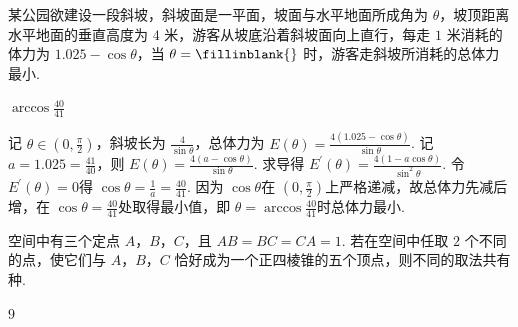 \begin{problem}
某公园欲建设一段斜坡，斜坡面是一平面，坡面与水平地面所成角为 \(\theta\)，坡顶距离水平地面的垂直高度为 \(4\) 米，游客从坡底沿着斜坡面向上直行，每走 \(1\) 米消耗的体力为 \(1.025-\cos\theta\)，当 \(\theta=\fillinblank{}\) 时，游客走斜坡所消耗的总体力最小.
\end{problem}

\begin{answer}
\(\arccos\frac{40}{41}\)
\end{answer}

\begin{solution}
记 \(\theta\in\left(0,\frac{\pi}{2}\right)\)，斜坡长为 \(\frac{4}{\sin\theta}\)，总体力为 \(E\left(\theta\right)=\frac{4\left(1.025-\cos\theta\right)}{\sin\theta}\). 记 \(a=1.025=\frac{41}{40}\)，则 \(E\left(\theta\right)=\frac{4\left(a-\cos\theta\right)}{\sin\theta}\). 求导得 \(E^{\prime}\left(\theta\right)=\frac{4\left(1-a\cos\theta\right)}{\sin^{2}\theta}\). 令 \(E^{\prime}\left(\theta\right)=0\)得 \(\cos\theta=\frac{1}{a}=\frac{40}{41}\). 因为 \(\cos\theta\)在 \(\left(0,\frac{\pi}{2}\right)\)上严格递减，故总体力先减后增，在 \(\cos\theta=\frac{40}{41}\)处取得最小值，即 \(\theta=\arccos\frac{40}{41}\)时总体力最小.
\end{solution}

\begin{problem}
空间中有三个定点 \(A\)，\(B\)，\(C\)，且 \(AB=BC=CA=1\). 若在空间中任取 \(2\) 个不同的点，使它们与 \(A\)，\(B\)，\(C\) 恰好成为一个正四棱锥的五个顶点，则不同的取法共有\fillinblank{} 种.
\end{problem}

\begin{answer}
\(9\)
\end{answer}

